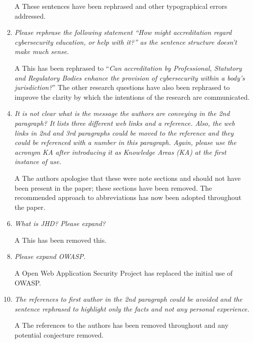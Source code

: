 \documentclass[a4paper,11pt]{article}
\begin{document}
\begin{enumerate}
\item[A] These sentences have been rephrased and other typographical errors addressed.

\item {\emph{Please rephrase the following statement ``How might
  accreditation regard cybersecurity education, or help with it?'' as
  the sentence structure doesn't make much sense.}}

\item[A] This has been rephrased to ``{\emph{Can accreditation by
      Professional, Statutory and Regulatory Bodies enhance the
      provision of cybersecurity within a body's jurisdiction?}}'' The
  other research questions have also been rephrased to improve the
  clarity by which the intentions of the research are communicated.

\item {\emph{It is not clear what is the message the authors are
      conveying in the 2nd paragraph? It lists three different web
      links and a reference. Also, the web links in 2nd and 3rd
      paragraphs could be moved to the reference and they could be
      referenced with a number in this paragraph. Again, please use
      the acronym KA after introducing it as Knowledge Areas (KA) at
      the first instance of use.}}

\item[A] The authors apologise that these were note sections and should
  not have been present in the paper; these sections have been
  removed. The recommended approach to abbreviations has now been
  adopted throughout the paper.

\item  {\emph{What is JHD? Please expand?}}

\item[A] This has been removed this. 

\item {\emph{Please expand OWASP.}}

\item[A]Open Web Application Security Project has replaced the initial use of OWASP.

\item {\emph{The references to first author in the 2nd paragraph could
      be avoided and the sentence rephrased to highlight only the
      facts and not any personal experience.}}
 
\item[A] The references to the authors has been removed throughout and
  any potential conjecture removed.


\end{enumerate}
\end{document}
